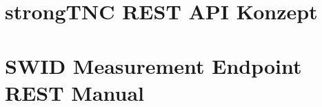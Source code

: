 

\section{strongTNC REST API Konzept}
\label{REST:api-konzept}


\section{SWID Measurement Endpoint REST Manual}
\label{REST:swid-measurement-manual}



